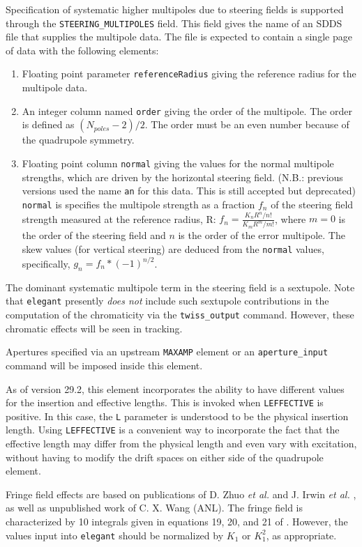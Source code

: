 Specification of systematic higher multipoles due to steering fields is
supported through the \verb|STEERING_MULTIPOLES| field.  This field gives the
name of an SDDS file that supplies the multipole data.  The file is
expected to contain a single page of data with the following elements:
\begin{enumerate}
\item Floating point parameter {\tt referenceRadius} giving the reference
 radius for the multipole data.
\item An integer column named {\tt order} giving the order of the multipole.
The order is defined as $(N_{poles}-2)/2$.  The order must be an even number
because of the quadrupole symmetry.
\item Floating point column {\tt normal} giving the values for the normal
multipole strengths, which are driven by the horizontal steering field.
(N.B.: previous versions used the name {\tt an} for this data. This is still accepted but deprecated)
{\tt normal} is specifies the multipole strength as a fraction $f_n$ of the steering field strength measured at the reference radius, R: 
$f_n = \frac{K_n R^n / n!}{K_m R^m / m!}$, where 
$m=0$ is the order of the steering field and $n$ is the order of the error multipole.
The skew values (for vertical steering) are deduced from the {\tt normal} values, specifically,
$g_n = f_n*(-1)^{n/2}$.
\end{enumerate}

The dominant systematic multipole term in the steering field is a
sextupole.  Note that {\tt elegant} presently {\em does not} include
such sextupole contributions in the computation of the chromaticity
via the {\tt twiss\_output} command.  However, these chromatic effects
will be seen in tracking.

Apertures specified via an upstream \verb|MAXAMP| element or an \verb|aperture_input|
command will be imposed inside this element.

As of version 29.2, this element incorporates the ability to have different values for the insertion
and effective lengths. This is invoked when \verb|LEFFECTIVE| is positive. In this case, the
\verb|L| parameter is understood to be the physical insertion length. Using \verb|LEFFECTIVE| is
a convenient way to incorporate the fact that the effective length may differ from the physical
length and even vary with excitation, without having to modify the drift spaces on either side of
the quadrupole element.

Fringe field effects  are based on publications of D.  Zhuo {\em et al.} \cite{Zhou-IPAC10} and  J. Irwin {\em et
  al.} \cite{Irwin-PAC95}, as well as unpublished work of C. X. Wang (ANL).  The fringe field is characterized by 
10 integrals given in equations 19, 20, and 21 of \cite{Zhou-IPAC10}.  However, the values input into {\tt elegant}
should be normalized by $K_1$ or $K_1^2$, as appropriate.

